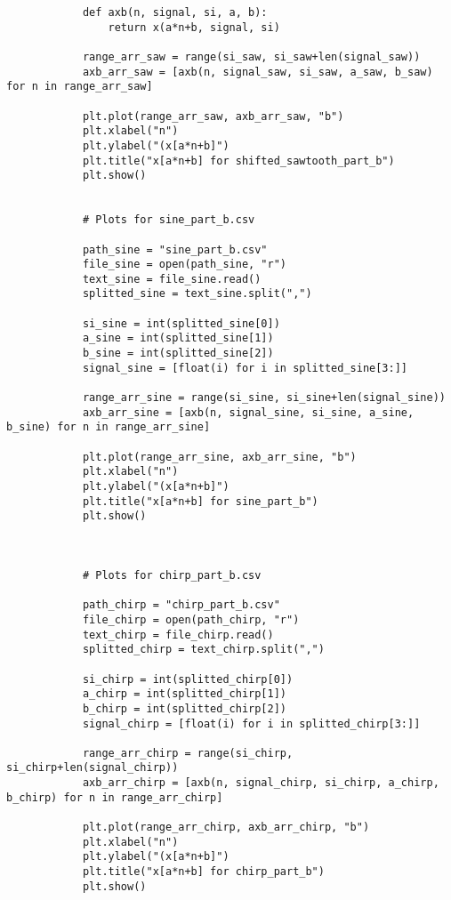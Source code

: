 \documentclass[10pt,a4paper, margin=1in]{article}
\begin{document}
\begin{enumerate}
\begin{enumerate}
\begin{verbatim}
            def axb(n, signal, si, a, b):
                return x(a*n+b, signal, si)
            
            range_arr_saw = range(si_saw, si_saw+len(signal_saw))
            axb_arr_saw = [axb(n, signal_saw, si_saw, a_saw, b_saw) for n in range_arr_saw]
            
            plt.plot(range_arr_saw, axb_arr_saw, "b")
            plt.xlabel("n")
            plt.ylabel("(x[a*n+b]")
            plt.title("x[a*n+b] for shifted_sawtooth_part_b")
            plt.show()
            
            
            # Plots for sine_part_b.csv
            
            path_sine = "sine_part_b.csv" 
            file_sine = open(path_sine, "r")
            text_sine = file_sine.read()
            splitted_sine = text_sine.split(",")
            
            si_sine = int(splitted_sine[0])
            a_sine = int(splitted_sine[1])
            b_sine = int(splitted_sine[2])
            signal_sine = [float(i) for i in splitted_sine[3:]]
            
            range_arr_sine = range(si_sine, si_sine+len(signal_sine))
            axb_arr_sine = [axb(n, signal_sine, si_sine, a_sine, b_sine) for n in range_arr_sine]
            
            plt.plot(range_arr_sine, axb_arr_sine, "b")
            plt.xlabel("n")
            plt.ylabel("(x[a*n+b]")
            plt.title("x[a*n+b] for sine_part_b")
            plt.show()
            
            
            
            # Plots for chirp_part_b.csv
            
            path_chirp = "chirp_part_b.csv" 
            file_chirp = open(path_chirp, "r")
            text_chirp = file_chirp.read()
            splitted_chirp = text_chirp.split(",")
            
            si_chirp = int(splitted_chirp[0])
            a_chirp = int(splitted_chirp[1])
            b_chirp = int(splitted_chirp[2])
            signal_chirp = [float(i) for i in splitted_chirp[3:]]
            
            range_arr_chirp = range(si_chirp, si_chirp+len(signal_chirp))
            axb_arr_chirp = [axb(n, signal_chirp, si_chirp, a_chirp, b_chirp) for n in range_arr_chirp]
            
            plt.plot(range_arr_chirp, axb_arr_chirp, "b")
            plt.xlabel("n")
            plt.ylabel("(x[a*n+b]")
            plt.title("x[a*n+b] for chirp_part_b")
            plt.show()
        \end{verbatim}
        
        \end{enumerate}    
    
    \end{enumerate}
    
\end{document}
